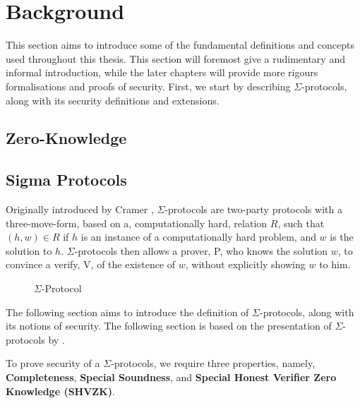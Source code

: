 \chapter{Background}
\label{ch:background}
This section aims to introduce some of the fundamental definitions and concepts
used throughout this thesis. This section will foremost give a rudimentary and
informal introduction, while the later chapters will provide more rigours
formalisations and proofs of security.
First, we start by describing $\Sigma$-protocols, along with its security
definitions and extensions.

\section{Zero-Knowledge}
\label{sec:background:zk}


\section{Sigma Protocols}
\label{sec:background:sigma_protocols}
Originally introduced by Cramer , $\Sigma$-protocols are two-party protocols with a
three-move-form, based on a, computationally hard, relation $R$, such that $(h, w) \in R$
if $h$ is an instance of a computationally hard problem, and $w$ is
the solution to $h$. $\Sigma$-protocols then allows a prover, P, who knows the
solution $w$, to convince a verify, V, of the existence of $w$, without
explicitly showing $w$ to him.

\begin{figure}[ht]
  \centering
  \caption{\label{fig:proto_sigma} $\Sigma$-Protocol}
\end{figure}


The following section aims to introduce the definition of $\Sigma$-protocols,
along with its notions of security. The following section is based on the
presentation of $\Sigma$-protocols by \citet{on-sigma-protocols}.


\begin{definition}
\label{def:sigma:sec}
To prove security of a $\Sigma$-protocols, we require three properties, namely,
\textbf{Completeness}, \textbf{Special Soundness}, and \textbf{Special Honest Verifier Zero Knowledge (SHVZK)}.
\end{definition}

